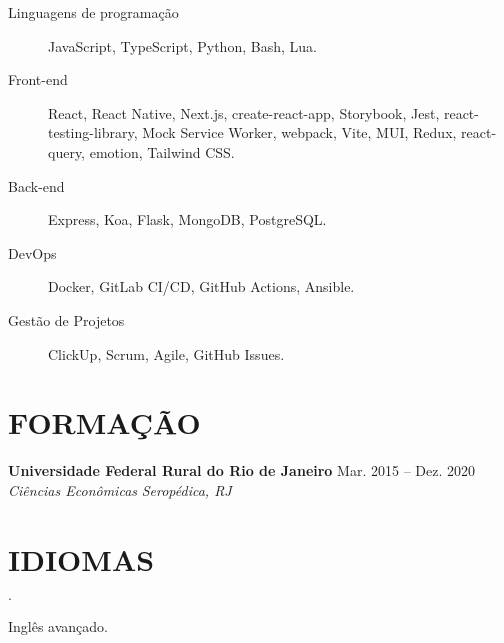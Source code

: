 \documentclass[12pt]{article}
\newenvironment{tightlist}
  {\begin{list}
    {$\cdot$}
    {
      \setlength{\leftmargin}{0em}
      \setlength{\itemsep}{\smallskipamount}
    }
  }
{\end{list}}
\begin{document}
\begin{description}
  \item[Linguagens de programação] JavaScript, TypeScript, Python, Bash, Lua.
  \item[Front-end] React, React Native, Next.js, create-react-app, Storybook,
    Jest, react-testing-library, Mock Service Worker, webpack, Vite, MUI, Redux,
    react-query, emotion, Tailwind CSS.
  \item[Back-end] Express, Koa, Flask, MongoDB, PostgreSQL.
  \item[DevOps] Docker, GitLab CI/CD, GitHub Actions, Ansible.
  \item[Gestão de Projetos] ClickUp, Scrum, Agile, GitHub Issues.
\end{description}

\section*{FORMAÇÃO}

\textbf{Universidade Federal Rural do Rio de Janeiro} \hfill {Mar. 2015 -- Dez. 2020} \\
\textit{Ciências Econômicas} \hfill \textit{Seropédica, RJ} {\parfillskip=0pt\par}

\section*{IDIOMAS}

\begin{tightlist}
  \item Inglês avançado.
\end{tightlist}
\end{document}
